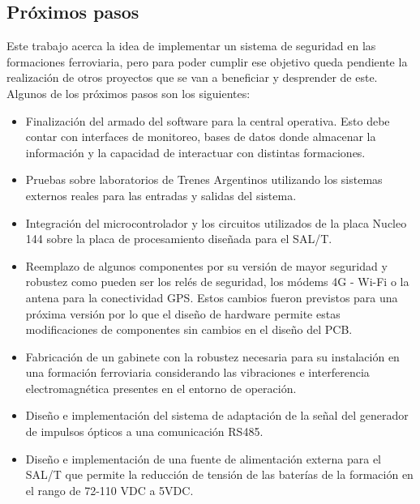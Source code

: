 \subsection{Próximos pasos}

Este trabajo acerca la idea de implementar un sistema de seguridad en las formaciones ferroviaria, pero para poder cumplir ese objetivo queda pendiente la realización de otros proyectos que se van a beneficiar y desprender de este. Algunos de los próximos pasos son los siguientes:

\begin{itemize}
    \item Finalización del armado del software para la central operativa. Esto debe contar con interfaces de monitoreo, bases de datos donde almacenar la información y la capacidad de interactuar con distintas formaciones. 

    \item Pruebas sobre laboratorios de Trenes Argentinos utilizando los sistemas externos reales para las entradas y salidas del sistema.

    \item Integración del microcontrolador y los circuitos utilizados de la placa Nucleo 144 sobre la placa de procesamiento diseñada para el SAL/T.

    \item Reemplazo de algunos componentes por su versión de mayor seguridad y robustez como pueden ser los relés de seguridad, los módems 4G - Wi-Fi o la antena para la conectividad GPS. Estos cambios fueron previstos para una próxima versión por lo que el diseño de hardware permite estas modificaciones de componentes sin cambios en el diseño del PCB. 

    \item Fabricación de un gabinete con la robustez necesaria para su instalación en una formación ferroviaria considerando las vibraciones e interferencia electromagnética presentes en el entorno de operación.

    \item Diseño e implementación del sistema de adaptación de la señal del generador de impulsos ópticos a una comunicación RS485.

    \item Diseño e implementación de una fuente de alimentación externa para el SAL/T que permite la reducción de tensión de las baterías de la formación en el rango de 72-110 VDC a 5VDC. 

    
\end{itemize}